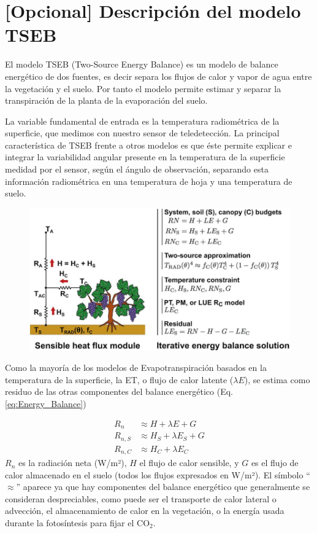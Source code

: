 \documentclass[a4paper,11pt]{article}
\begin{document}
\section{{[Opcional]} Descripción del modelo TSEB}
  El modelo TSEB (Two-Source Energy Balance) es un modelo de balance energético de dos fuentes, es decir separa los flujos de calor y vapor de agua entre la vegetación y el suelo. Por tanto el modelo permite estimar y separar la transpiración de la planta de la evaporación del suelo.
  
  La variable fundamental de entrada es la temperatura radiométrica de la superficie, que medimos con nuestro sensor de teledetección. La principal característica de TSEB frente a otros modelos es que éste permite explicar e integrar la variabilidad angular presente en la temperatura de la superficie medidad por el sensor, según el ángulo de observación, separando esta información radiométrica en una temperatura de hoja y una temperatura de suelo.
  
  \begin{figure}[H]\centering
   \includegraphics[width=\textwidth]{tseb_scheme}
  \end{figure}
  
  Como la mayoría de los modelos de Evapotranspiración basados en la temperatura de la superficie, la ET, o flujo de calor latente ($\lambda E$), se estima como residuo de las otras componentes del balance energético (Eq. \ref{eq:Energy_Balance})
  
  \begin{subequations}\label{eq:Energy_Balance}
   \begin{align}
    R_{n} & \approx H + \lambda E + G\\
    R_{n,S} & \approx H_{S} + \lambda E_{S} + G\\
    R_{n,C} & \approx H_{C} + \lambda E_{C}\label{eq:Energy_Balance_TSEB}
   \end{align}
  \end{subequations}
  $R_n$ es la radiación neta (W/m²), $H$ el flujo de calor sensible, y $G$ es el flujo de calor almacenado en el suelo (todos los flujos expresados en W/m²). El símbolo ``$\approx$'' aparece ya que hay componentes del balance energético que generalmente se consideran despreciables, como puede ser el transporte de calor lateral o advección, el almacenamiento de calor en la vegetación, o la energía usada durante la fotosíntesis para fijar el CO$_2$.
  
\end{document}
